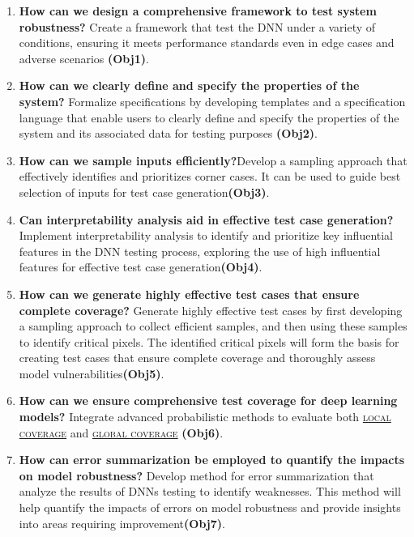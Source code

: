 \begin{enumerate}

    \item \textbf{How can we design a comprehensive framework to test system robustness?} Create a framework that test the DNN under a variety of conditions, ensuring it meets performance standards even in edge cases and adverse scenarios \textbf{(Obj1)}.

  
    \item \textbf{How can we clearly define and specify the properties of the system?} Formalize specifications by developing templates and a specification language that enable users to clearly define and specify the properties of the system and its associated data for testing purposes \textbf{(Obj2)}.

    
    \item \textbf{How can we sample inputs efficiently?}Develop a sampling approach that effectively identifies and prioritizes corner cases. It can be used to guide best selection of inputs for test case generation\textbf{(Obj3)}.
    
    \item \textbf{Can interpretability analysis aid in effective test case generation?} Implement interpretability analysis to identify and prioritize key influential features in the DNN testing process, exploring the use of high influential features for effective test case generation\textbf{(Obj4)}.
   
    \item \textbf{How can we generate highly effective test cases that ensure complete coverage?} Generate highly effective test cases by first developing a sampling approach to collect efficient samples, and then using these samples to identify critical pixels. The identified critical pixels will form the basis for creating test cases that ensure complete coverage and thoroughly assess model vulnerabilities\textbf{(Obj5)}.
 
    \item \textbf{How can we ensure comprehensive test coverage for deep learning models?} Integrate advanced probabilistic methods to evaluate both \hyperref[gloss]{\textsc{\textsc{local coverage}}} \label{Local coverage} and \hyperref[gloss]{\textsc{\textsc{global coverage}}} \label{Global coverage} \textbf{(Obj6)}.
               
    \item \textbf{How can error summarization be employed to quantify the impacts on model robustness?} Develop method for error summarization that analyze the results of DNNs testing to identify weaknesses. This method will help quantify the impacts of errors on model robustness and provide insights into areas requiring improvement\textbf{(Obj7)}.
  

  
\end{enumerate}




